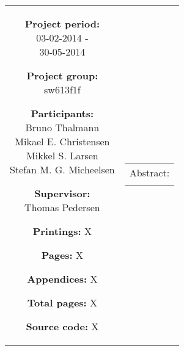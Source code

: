\begin{titlepage}
\begin{nopagebreak}
{\begin{tabular}{cc}
{	\parbox{8cm}{
	\begin{description}
		\item { \textbf{Project period:}}\\
			03-02-2014 -\\
			30-05-2014
 		\hspace{4cm}
		\item { \textbf{Project group:}}\\
  			sw613f1f
 		\hspace{4cm}
		\item {\textbf{Participants:}}\\
			Bruno Thalmann\\
			Mikael E. Christensen\\
			Mikkel S. Larsen\\
			Stefan M. G. Micheelsen\\
		\hspace{2cm}
		\item { \textbf{Supervisor:}}\\
 			Thomas Pedersen\\
  	\end{description}
	}
	\begin{description}
		\item { \textbf{Printings:} X}
		\item { \textbf{Pages:} X } 
		\item { \textbf{Appendices:} X}
		\item { \textbf{Total pages:} X }
		\item { \textbf{Source code:} X}
	\end{description}
	\vfill } &
	\parbox{6.5cm}{
 	 \vspace{.15cm}
  	\hfill 
  	\begin{tabular}{l}
  		{ Abstract:}\bigskip \\
  		\fbox{
  		\parbox{6cm}{\bigskip
     		{\vfill{\small 
     		\bigskip}}
     	}}
   	\end{tabular}}
\end{tabular}
}%
\\
\vfill
{}
\end{nopagebreak}
\end{titlepage}
